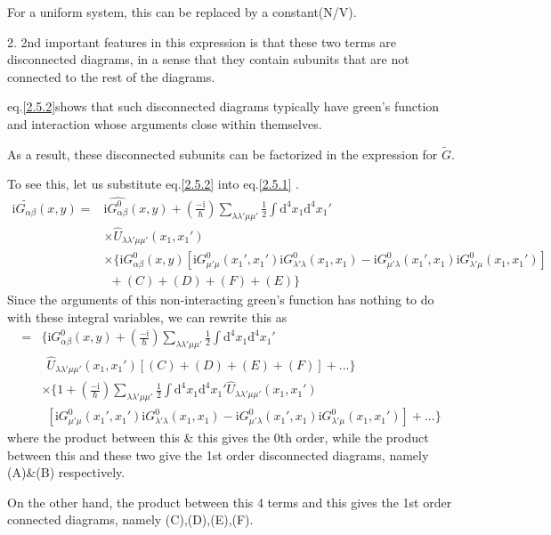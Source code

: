For a uniform system, this can be replaced by a constant(N/V).

2. 2nd important features in this expression is that these two terms are  disconnected diagrams, in a sense that they contain subunits that are not connected to the rest of the diagrams.

eq.\ref{2.5.2}shows that such disconnected diagrams typically have green's function and interaction whose arguments close within themselves.

As a result, these disconnected subunits can be factorized in the expression for $\tilde{G}$.

To see this, let us substitute eq.\ref{2.5.2} into eq.\ref{2.5.1} .
\begin{align}
\mathrm{i}\tilde{G_{\alpha\beta}}(x,y)=&\mathrm{i}\hat{G_{\alpha\beta}^0}(x,y)+(\frac{-\mathrm{i}}{\hbar})\sum_{\lambda\lambda'\mu\mu'}\frac{1}{2}\int\mathrm{d}^4x_1\mathrm{d}^4x_1' \nonumber \\
&\times \hat{U}_{\lambda\lambda'\mu\mu'}(x_1,x_1') \nonumber \\
&\times\{\mathrm{i}G_{\alpha\beta}^0(x,y)[\mathrm{i}G^0_{\mu'\mu}(x_1',x_1')\mathrm{i}G^0_{\lambda'\lambda}(x_1,x_1)-\mathrm{i}G^0_{\mu'\lambda}(x_1',x_1)\mathrm{i}G^0_{\lambda'\mu}(x_1,x_1')]\nonumber \\
&\ \ +(C)+(D)+(F)+(E)\} \nonumber
\end{align}
Since the arguments of this non-interacting green's function has nothing to do with these integral variables, we can rewrite this as
\begin{align}
=&\{\mathrm{i}G_{\alpha\beta}^0(x,y)+(\frac{-\mathrm{i}}{\hbar})\sum_{\lambda\lambda'\mu\mu'}\frac{1}{2}\int\mathrm{d}^4x_1\mathrm{d}^4x_1' \nonumber \\
&\ \ \hat{U}_{\lambda\lambda'\mu\mu'}(x_1,x_1')[(C)+(D)+(E)+(F)]+...\} \nonumber \\
&\times \{1+(\frac{-\mathrm{i}}{\hbar})\sum_{\lambda\lambda'\mu\mu'}\frac{1}{2}\int\mathrm{d}^4x_1\mathrm{d}^4x_1'\hat{U}_{\lambda\lambda'\mu\mu'}(x_1,x_1') \nonumber \\
&\ \ [\mathrm{i}G^0_{\mu'\mu}(x_1',x_1')\mathrm{i}G^0_{\lambda'\lambda}(x_1,x_1)-\mathrm{i}G^0_{\mu'\lambda}(x_1',x_1)\mathrm{i}G^0_{\lambda'\mu}(x_1,x_1')]+...\} \nonumber
\end{align}
where the product between this \& this gives the 0th order, while the product between this and these two give the 1st order disconnected diagrams, namely (A)\&(B) respectively.

On the other hand, the product between this 4 terms and this gives the 1st order connected diagrams, namely (C),(D),(E),(F).

